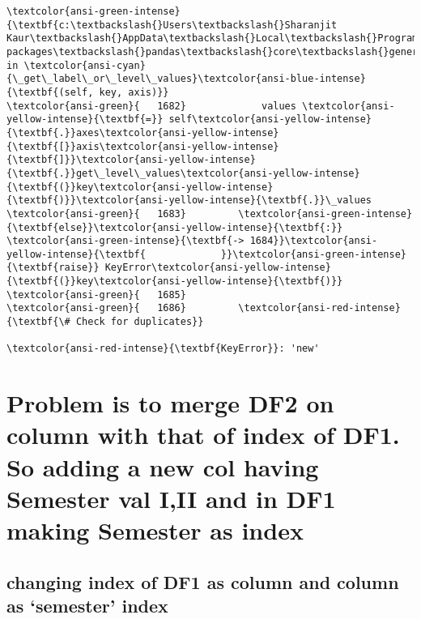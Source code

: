\documentclass[11pt]{article}
\begin{document}
\begin{Verbatim}[commandchars=\\\{\}, frame=single, framerule=2mm, rulecolor=\color{outerrorbackground}]
\textcolor{ansi-green-intense}{\textbf{c:\textbackslash{}Users\textbackslash{}Sharanjit Kaur\textbackslash{}AppData\textbackslash{}Local\textbackslash{}Programs\textbackslash{}Python\textbackslash{}Python39\textbackslash{}lib\textbackslash{}site-packages\textbackslash{}pandas\textbackslash{}core\textbackslash{}generic.py}} in \textcolor{ansi-cyan}{\_get\_label\_or\_level\_values}\textcolor{ansi-blue-intense}{\textbf{(self, key, axis)}}
\textcolor{ansi-green}{   1682}             values \textcolor{ansi-yellow-intense}{\textbf{=}} self\textcolor{ansi-yellow-intense}{\textbf{.}}axes\textcolor{ansi-yellow-intense}{\textbf{[}}axis\textcolor{ansi-yellow-intense}{\textbf{]}}\textcolor{ansi-yellow-intense}{\textbf{.}}get\_level\_values\textcolor{ansi-yellow-intense}{\textbf{(}}key\textcolor{ansi-yellow-intense}{\textbf{)}}\textcolor{ansi-yellow-intense}{\textbf{.}}\_values
\textcolor{ansi-green}{   1683}         \textcolor{ansi-green-intense}{\textbf{else}}\textcolor{ansi-yellow-intense}{\textbf{:}}
\textcolor{ansi-green-intense}{\textbf{-> 1684}}\textcolor{ansi-yellow-intense}{\textbf{             }}\textcolor{ansi-green-intense}{\textbf{raise}} KeyError\textcolor{ansi-yellow-intense}{\textbf{(}}key\textcolor{ansi-yellow-intense}{\textbf{)}}
\textcolor{ansi-green}{   1685} 
\textcolor{ansi-green}{   1686}         \textcolor{ansi-red-intense}{\textbf{\# Check for duplicates}}

\textcolor{ansi-red-intense}{\textbf{KeyError}}: 'new'
    \end{Verbatim}

    \hypertarget{problem-is-to-merge-df2-on-column-with-that-of-index-of-df1.-so-adding-a-new-col-having-semester-val-iii-and-in-df1-making-semester-as-index}{%
\section{Problem is to merge DF2 on column with that of index of DF1. So
adding a new col having Semester val I,II and in DF1 making Semester as
index}\label{problem-is-to-merge-df2-on-column-with-that-of-index-of-df1.-so-adding-a-new-col-having-semester-val-iii-and-in-df1-making-semester-as-index}}

    \hypertarget{changing-index-of-df1-as-column-and-column-as-semester-index}{%
\subsection{changing index of DF1 as column and column as `semester'
index}\label{changing-index-of-df1-as-column-and-column-as-semester-index}}
\end{document}
